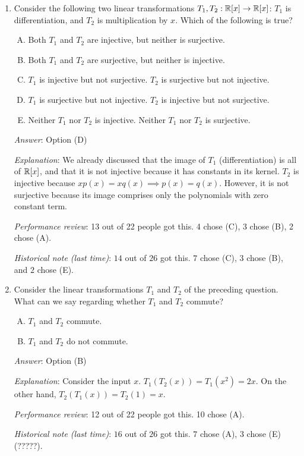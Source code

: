 \documentclass[10pt]{amsart}
\begin{document}
\begin{enumerate}
  {\em Historical note (last time)}: $17$ out of $26$ got this. $3$ each chose
  (A), (B), and (D).

\item Consider the following two linear transformations $T_1,T_2:\mathbb{R}[x]
  \to \mathbb{R}[x]$: $T_1$ is differentiation, and $T_2$ is multiplication by
  $x$. Which of the following is true?

  \begin{enumerate}[(A)]
  \item Both $T_1$ and $T_2$ are injective, but neither is surjective.
  \item Both $T_1$ and $T_2$ are surjective, but neither is injective.
  \item $T_1$ is injective but not surjective. $T_2$ is surjective but not injective.
  \item $T_1$ is surjective but not injective. $T_2$ is injective but
    not surjective.
  \item Neither $T_1$ nor $T_2$ is injective. Neither $T_1$ nor $T_2$
    is surjective.
  \end{enumerate}

  {\em Answer}: Option (D)

  {\em Explanation}: We already discussed that the image of $T_1$
  (differentiation) is all of $\mathbb{R}[x]$, and that it is not injective
  because it has constants in its kernel. $T_2$ is injective because
  $xp(x) = xq(x) \implies p(x) = q(x)$. However, it is not surjective
  because its image comprises only the polynomials with zero constant
  term.

  {\em Performance review}: 13 out of 22 people got this. 4 chose (C),
  3 chose (B), 2 chose (A).

  {\em Historical note (last time)}: $14$ out of $26$ got this. $7$ chose (C),
  $3$ chose (B), and $2$ chose (E).

\item Consider the linear transformations $T_1$ and $T_2$ of the
  preceding question. What can we say regarding whether $T_1$ and
  $T_2$ commute?

  \begin{enumerate}[(A)]
  \item $T_1$ and $T_2$ commute.
  \item $T_1$ and $T_2$ do not commute.
  \end{enumerate}

  {\em Answer}: Option (B)

  {\em Explanation}: Consider the input $x$. $T_1(T_2(x)) = T_1(x^2) =
  2x$. On the other hand, $T_2(T_1(x)) = T_2(1) = x$.

  {\em Performance review}: 12 out of 22 people got this. 10 chose (A).

  {\em Historical note (last time)}: $16$ out of $26$ got this. $7$ chose (A),
  $3$ chose (E) (?????).
\end{enumerate}
\end{document}
